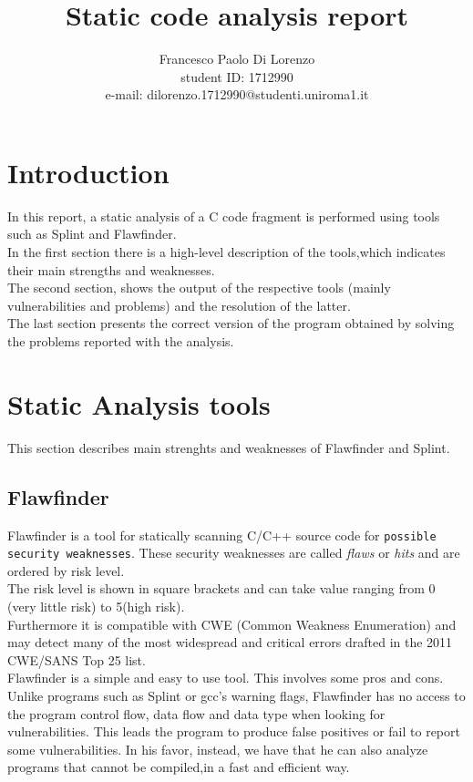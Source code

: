 \documentclass[a4paper,12pt]{article}
\begin{document}
%
   \title{Static code analysis report}

   \author{Francesco Paolo Di Lorenzo  \\ student ID: 1712990 \\ e-mail: dilorenzo.1712990@studenti.uniroma1.it}
          
   \date{}

   \maketitle
   
   
 


\section*{Introduction}
In this report, a static analysis of a C code fragment is performed using tools such as Splint and Flawfinder. \\
In the first section there is a high-level description of the tools,which indicates their main strengths and weaknesses. \\
The second section, shows the output of the respective tools (mainly vulnerabilities and problems) and the resolution of the latter.\\
The last section presents the correct version of the program obtained by solving the problems reported with the analysis.


\section{Static Analysis tools}
This section describes main strenghts and weaknesses of Flawfinder and Splint.
\subsection{Flawfinder}
Flawfinder is a tool for statically scanning C/C++ source code for \texttt{possible security weaknesses}. These security weaknesses are called \textit{flaws} or \textit{hits} and are ordered by risk level.\\
The risk level is shown in square brackets and can take value ranging from 0 (very little risk) to 5(high risk)\cite{flaw}.\\
Furthermore it is compatible with CWE (Common
Weakness Enumeration)\cite{flaw2}\cite{CWE} and may detect many of the most widespread and
critical errors drafted in the 2011 CWE/SANS Top 25 list.\\
Flawfinder is a simple and easy to use tool. This involves some pros and cons.\cite{flaw}\\
Unlike programs such as Splint or gcc's warning flags, Flawfinder has no access to the program control flow, data flow and data type when looking for vulnerabilities.
This leads the program to produce false positives or fail to report some vulnerabilities.
In his favor, instead, we have that he can also analyze programs that cannot be compiled,in a fast and efficient way.
\end{document}

